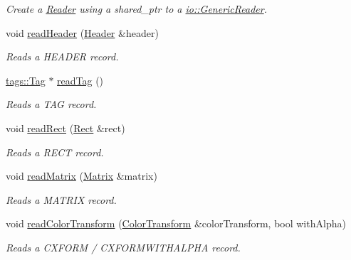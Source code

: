 \begin{DoxyCompactItemize}
\begin{DoxyCompactList}\small\item\em Create a \hyperlink{classjswf_1_1flash_1_1_reader}{Reader} using a {\ttfamily shared\+\_\+ptr} to a \hyperlink{classjswf_1_1io_1_1_generic_reader}{io\+::\+Generic\+Reader}. \end{DoxyCompactList}\item 
void \hyperlink{classjswf_1_1flash_1_1_reader_ae8d28fd2729553fa394027cb79df53f9}{read\+Header} (\hyperlink{structjswf_1_1flash_1_1_header}{Header} \&header)
\begin{DoxyCompactList}\small\item\em Reads a {\ttfamily H\+E\+A\+D\+E\+R} record. \end{DoxyCompactList}\item 
\hyperlink{classjswf_1_1flash_1_1tags_1_1_tag}{tags\+::\+Tag} $\ast$ \hyperlink{classjswf_1_1flash_1_1_reader_a515a1f5e100cd4bbb236e147d26d5987}{read\+Tag} ()
\begin{DoxyCompactList}\small\item\em Reads a {\ttfamily T\+A\+G} record. \end{DoxyCompactList}\item 
void \hyperlink{classjswf_1_1flash_1_1_reader_a4ae8c183b1dd3661bc16a85ccf93973e}{read\+Rect} (\hyperlink{structjswf_1_1flash_1_1_rect}{Rect} \&rect)
\begin{DoxyCompactList}\small\item\em Reads a {\ttfamily R\+E\+C\+T} record. \end{DoxyCompactList}\item 
void \hyperlink{classjswf_1_1flash_1_1_reader_a1619dc50eea06c0cbac9c5065d1c80d4}{read\+Matrix} (\hyperlink{structjswf_1_1flash_1_1_matrix}{Matrix} \&matrix)
\begin{DoxyCompactList}\small\item\em Reads a {\ttfamily M\+A\+T\+R\+I\+X} record. \end{DoxyCompactList}\item 
void \hyperlink{classjswf_1_1flash_1_1_reader_a5cc00c7ec945fffc7c73ca6d741b4ccc}{read\+Color\+Transform} (\hyperlink{structjswf_1_1flash_1_1_color_transform}{Color\+Transform} \&color\+Transform, bool with\+Alpha)
\begin{DoxyCompactList}\small\item\em Reads a {\ttfamily C\+X\+F\+O\+R\+M} / {\ttfamily C\+X\+F\+O\+R\+M\+W\+I\+T\+H\+A\+L\+P\+H\+A} record. \end{DoxyCompactList}\item 

\end{DoxyCompactItemize}
